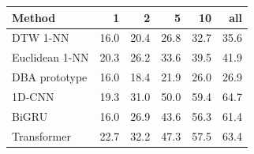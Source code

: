 \begin{tabular}{lrrrrr}
\toprule
Method & 1 & 2 & 5 & 10 & all \\
\midrule
DTW 1-NN & 16.0 & 20.4 & 26.8 & 32.7 & 35.6 \\
Euclidean 1-NN & 20.3 & 26.2 & 33.6 & 39.5 & 41.9 \\
DBA prototype & 16.0 & 18.4 & 21.9 & 26.0 & 26.9 \\
1D-CNN & 19.3 & 31.0 & 50.0 & 59.4 & 64.7 \\
BiGRU & 16.0 & 26.9 & 43.6 & 56.3 & 61.4 \\
Transformer & 22.7 & 32.2 & 47.3 & 57.5 & 63.4 \\
\bottomrule
\end{tabular}
